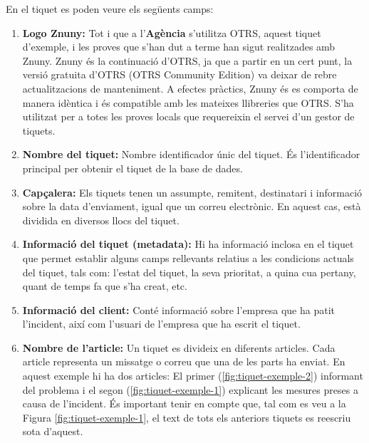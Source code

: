 En el tiquet es poden veure els següents camps:
\begin{enumerate}
    \item \textbf{Logo Znuny:} Tot i que a l'\textbf{Agència} s'utilitza OTRS, aquest tiquet d'exemple, i les proves que s'han dut a terme han sigut realitzades amb Znuny. Znuny és la continuació d'OTRS, ja que a partir en un cert punt, la versió gratuita d'OTRS (OTRS Community Edition) va deixar de rebre actualitzacions de manteniment. A efectes pràctics, Znuny és es comporta de manera idèntica i és compatible amb les mateixes llibreries que OTRS. S'ha utilitzat per a totes les proves locals que requereixin el servei d'un gestor de tiquets.
    \item \textbf{Nombre del tiquet:} Nombre identificador únic del tiquet. És l'identificador principal per obtenir el tiquet de la base de dades.
    \item \textbf{Capçalera:} Els tiquets tenen un assumpte, remitent, destinatari i informació sobre la data d'enviament, igual que un correu electrònic. En aquest cas, està dividida en diversos llocs del tiquet.
    \item \textbf{Informació del tiquet (metadata):} Hi ha informació inclosa en el tiquet que permet establir alguns camps rellevants relatius a les condicions actuals del tiquet, tals com: l'estat del tiquet, la seva prioritat, a quina cua pertany, quant de temps fa que s'ha creat, etc.
    \item \textbf{Informació del client:} Conté informació sobre l'empresa que ha patit l'incident, així com l'usuari de l'empresa que ha escrit el tiquet.
    \item \textbf{Nombre de l'article:} Un tiquet es divideix en diferents articles. Cada article representa un missatge o correu que una de les parts ha enviat. En aquest exemple hi ha dos articles: El primer (\ref{fig:tiquet-exemple-2}) informant del problema i el segon (\ref{fig:tiquet-exemple-1}) explicant les mesures preses a causa de l'incident. És important tenir en compte que, tal com es veu a la Figura \ref{fig:tiquet-exemple-1}, el text de tots els anteriors tiquets es reescriu sota d'aquest.
\end{enumerate}

